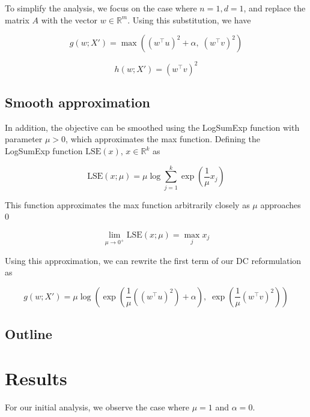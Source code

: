 \documentclass[11pt]{article}
\begin{document}
To simplify the analysis, we focus on the case where $n = 1, d = 1$, and replace the matrix $A$ with the vector $w \in \mathbb{R}^m$. Using this substitution, we have

\begin{equation}
    g(w; X') = \max((w^{\top} u)^2 + \alpha, \; (w^{\top} v)^2)
\end{equation}

\begin{equation}
    h(w; X') = (w^{\top} v)^2
\end{equation}

\subsection{Smooth approximation}

In addition, the objective can be smoothed using the LogSumExp function with parameter $\mu > 0$, which approximates the max function. Defining the LogSumExp function $\textrm{LSE}(x)$, $x \in \mathbb{R}^k$ as

\begin{equation}
    \textrm{LSE}(x; \mu) = \mu \log \sum_{j=1}^{k} \exp(\frac{1}{\mu}x_j)
\end{equation}

This function approximates the max function arbitrarily closely as $\mu$ approaches $0$

\begin{equation}
    \lim_{\mu \to 0^+}  \textrm{LSE}(x; \mu) = \max_j x_j
\end{equation}

Using this approximation, we can rewrite the first term of our DC reformulation as

\begin{equation}
    g(w; X') = \mu \log(\exp(\frac{1}{\mu}((w^{\top} u)^2) + \alpha), \; \exp(\frac{1}{\mu}(w^{\top} v)^2))
\end{equation}

\subsection{Outline}

\section{Results}

For our initial analysis, we observe the case where $\mu = 1$ and $\alpha = 0$.
\end{document}
